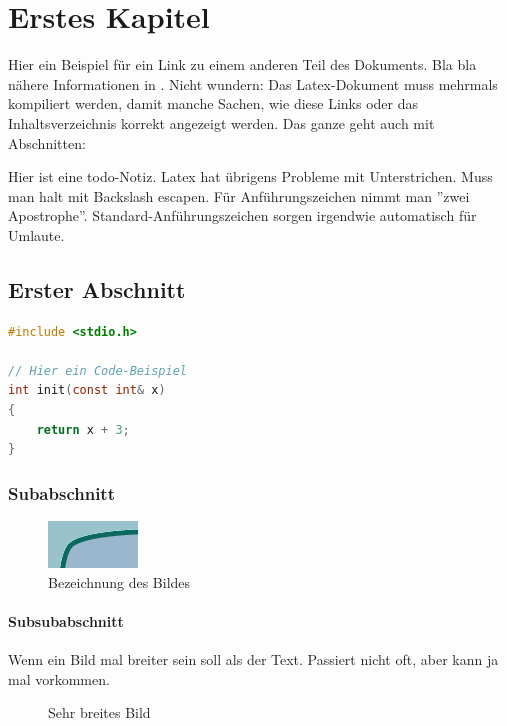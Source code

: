\chapter{Erstes Kapitel}
\label{erstes_kapitel} %

Hier ein Beispiel für ein Link zu einem anderen Teil des Dokuments. Bla bla nähere Informationen in . Nicht wundern: Das Latex-Dokument muss mehrmals kompiliert werden, damit manche Sachen, wie diese Links oder das Inhaltsverzeichnis korrekt angezeigt werden. Das ganze geht auch mit Abschnitten: 

Hier ist eine todo-Notiz. Latex hat übrigens Probleme mit Unterstrichen. Muss man halt mit Backslash escapen. Für Anführungszeichen nimmt man ''zwei Apostrophe''. Standard-Anführungszeichen sorgen irgendwie automatisch für Umlaute.

\section{Erster Abschnitt}
\label{ersterabschnitt}

\begin{lstlisting}[language=C, caption=Code Beispiel]
#include <stdio.h>

// Hier ein Code-Beispiel
int init(const int& x)
{
	return x + 3;
}
\end{lstlisting}

\subsection{Subabschnitt}

\begin{figure}[h] %
	\centering
		\includegraphics[scale=0.6]{Images/alpha_bug.png}
	\caption{Bezeichnung des Bildes}
\end{figure}

\newpage
\subsubsection{Subsubabschnitt}

Wenn ein Bild mal breiter sein soll als der Text. Passiert nicht oft, aber kann ja mal vorkommen.

\begin{figure}[h] %
	\caption{Sehr breites Bild}
\end{figure}